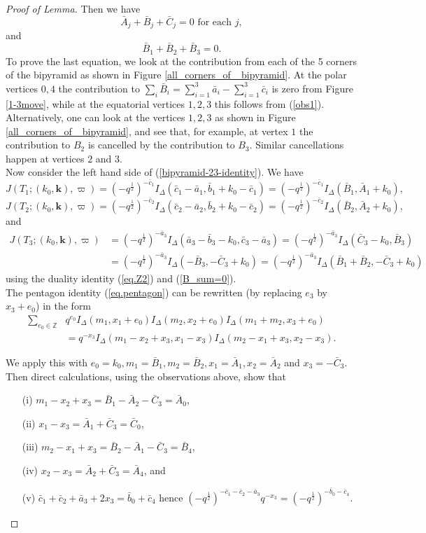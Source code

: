 \documentclass[12pt]{amsart}
\theoremstyle{definition}
\theoremstyle{remark}
\def\kk{\boldsymbol{k}}
\def\BZ{\mathbb Z}
\def\be{  \begin{equation} }
\def\ee{  \end{equation} }
\def\ID{I_{\Delta}}
\begin{document}
\begin{proof}[Proof of Lemma]
Then we have
\be
 \bar A_j + \bar B_j + \bar C_j =0 \text{ for each } j,
 \ee
 and 
\be
\bar B_1+\bar B_2+\bar B_3=0 .
\label{B_sum=0}
\ee
To prove the last equation, we look at the contribution from each of the 5 corners of the bipyramid
as shown in Figure \ref{all_corners_of_ bipyramid}.
At the polar vertices $0,4$ the contribution to 
$\sum_i \bar B_i= \sum_{i=1}^3 \bar a_i - \sum_{i=1}^3 \bar c_i$ is zero from Figure  \ref{1-3move},
while at the equatorial vertices $1,2,3$ this follows from (\ref{obs1}). Alternatively, one can look at the vertices $1,2,3$ as shown in Figure \ref{all_corners_of_ bipyramid}, and see that, for example, at vertex $1$ the contribution to $B_2$ is cancelled by the contribution to $B_3$. Similar cancellations happen at vertices $2$ and $3$.\\

Now consider the left hand side of (\ref{bipyramid-23-identity}). We have
$$J(T_1;(k_0,\kk),\varpi) = (-q^{\frac{1}{2}})^{-\bar c_1} \ID(\bar c_1-\bar a_1,\bar b_1+k_0-\bar c_1) =  
(-q^{\frac{1}{2}})^{-\bar c_1}\ID (\bar B_1,\bar A_1+k_0),$$
$$J(T_2;(k_0,\kk),\varpi) = (-q^{\frac{1}{2}})^{-\bar c_2} \ID(\bar c_2-\bar a_2,\bar b_2+k_0-\bar c_2) =  
(-q^{\frac{1}{2}})^{-\bar c_2}\ID (\bar B_2,\bar A_2+k_0),$$
and
\begin{align*}
J(T_3;(k_0,\kk),\varpi) &= (-q^{\frac{1}{2}})^{-\bar a_3}\ID (\bar a_3-\bar b_3-k_0,\bar c_3-\bar a_3) 
= (-q^{\frac{1}{2}})^{-\bar a_3}\ID (\bar C_3-k_0,\bar B_3) \\
&=(-q^{\frac{1}{2}})^{-\bar a_3}\ID (-\bar B_3,-\bar C_3+k_0) 
= (-q^{\frac{1}{2}})^{-\bar a_3}\ID (\bar B_1+\bar B_2,-\bar C_3+k_0)
\end{align*}
using  the duality identity (\ref{eq.Z2}) and (\ref{B_sum=0}).\\

The pentagon identity (\ref{eq.pentagon}) can be rewritten
(by replacing $e_3$ by $x_3 + e_0$)
in the form
\begin{align}
\sum_{e_0 \in \BZ}
& q^{e_0} \ID(m_1,x_1+e_0)\ID(m_2,x_2+e_0)\ID(m_1+m_2,x_3+e_0)   \label{pent_eq}\\
&=q^{-x_3} \ID(m_1-x_2+x_3,x_1-x_3)\ID(m_2-x_1+x_3,x_2-x_3) . \nonumber
\end{align}

We apply this with $e_0=k_{0}, m_1=\bar B_1,m_2=\bar B_2, x_1=\bar A_1,x_2=\bar A_2$ and
$x_3=-\bar C_3$.
Then direct calculations, using the observations above, show that 
\begin{enumerate}
\item[(i)] $m_1-x_2+x_3= \bar B_1-\bar A_2-\bar C_3=\bar A_0$, 
\item[(ii)] $x_1-x_3=\bar A_1+\bar C_3 =\bar C_0$, 
\item[(iii)] $m_2-x_1+x_3=\bar B_2-\bar A_1-\bar C_3=\bar B_4$, 
\item[(iv)] $x_2-x_3=\bar A_2+\bar C_3=\bar A_4$, and 
\item[(v)] $\bar c_1+\bar c_2+\bar a_3+2x_3 = \bar b_0+\bar c_4$ hence 
$(-q^{\frac{1}{2}})^{-\bar c_1-\bar c_2-\bar a_3} q^{-x_3}=  (-q^{\frac{1}{2}})^{ - \bar b_0-\bar c_4}.$
\end{enumerate}


\end{proof}
\end{document}
